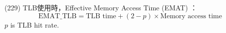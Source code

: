 \begin{theorem}{(229)} TLB使用時，Effective Memory Access Time (EMAT) ：
    \begin{equation}
        \text{EMAT\_TLB} = \text{TLB time} + (2 - p) \times \text{Memory access time} 
    \end{equation} $p$ is TLB hit rate.
\end{theorem}
